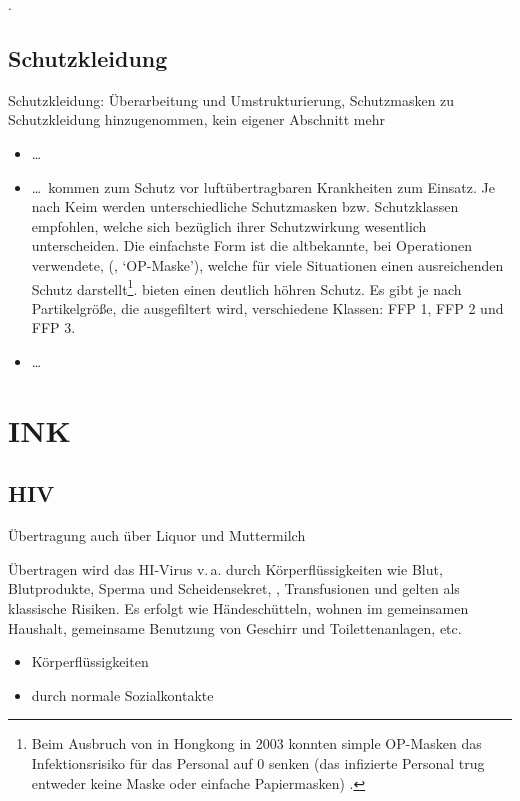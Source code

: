 \documentclass[
ngerman,
paper=a4,
asymmetric,
fontsize=10pt,
draft=false,
numbers=noenddot,
bibtotocnumbered,
footnotes=multiple,
]{scrreprt}
\newcommand{\jNEUende}{\newline{\color{green}\rule{\linewidth}{3pt}\newline}}
\begin{document}
.
\jNEUende

\subsection{Schutzkleidung}

 Schutzkleidung: Überarbeitung und Umstrukturierung,
Schutzmasken zu Schutzkleidung hinzugenommen, kein eigener Abschnitt mehr

{\label{topic:schutzkleidung-hygiene}%
\begin{itemize}
  \item \ldots
  \item {} \label{topic:atemmasken}%
  \ldots\ kommen zum Schutz vor
  luftübertragbaren Krankheiten zum Einsatz. Je nach Keim
  werden unterschiedliche Schutzmasken bzw. Schutzklassen empfohlen, welche sich
  bezüglich ihrer Schutzwirkung wesentlich unterscheiden.
  Die einfachste Form ist die altbekannte, bei Operationen verwendete,
  (, \enquote*{OP-Maske}), welche für viele Situationen einen
  ausreichenden Schutz darstellt\footnote{Beim Ausbruch von
   in Hongkong in 2003 konnten simple OP-Masken das
  Infektionsrisiko für das Personal auf 0 senken (das
  infizierte Personal trug entweder keine Maske oder einfache
  Papiermasken) \cite{Seto2003}.}.
   bieten einen deutlich höhren Schutz.
  Es gibt je nach Partikelgröße, die
  ausgefiltert wird, verschiedene Klassen: FFP 1, FFP 2 und FFP
  3.
  \item \ldots
\end{itemize}

}{

}{}{}{}

\section{INK}
\subsection{HIV}
Übertragung auch über Liquor und Muttermilch


 {%
 Übertragen wird das HI-Virus v.\,a. durch Körperflüssigkeiten
wie Blut, Blutprodukte, Sperma und Scheidensekret, 
 , Transfusionen und
  gelten als klassische Risiken.
 Es erfolgt  wie Händeschütteln, wohnen im
 gemeinsamen Haushalt, gemeinsame Benutzung von Geschirr und
 Toilettenanlagen, etc.
 }{
 \begin{itemize}
   \item Körperflüssigkeiten
   \item {} durch normale Sozialkontakte
 \end{itemize}
 }
 {}
 {}
 {}
\end{document}

